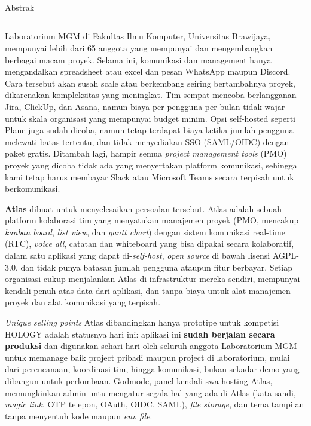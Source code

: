 \clearpage
\section[Abstrak]{}
\\[0.3em]
{\bricolagesb\fontsize{19pt}{22pt}\selectfont\color{cink} Abstrak}
\vspace{0.15em}\\
\noindent\textcolor{cblue!35!white}{\rule{\linewidth}{1.1pt}}
\vspace{0.55em}

Laboratorium MGM di Fakultas Ilmu Komputer, Universitas Brawijaya, mempunyai lebih dari 65 anggota yang mempunyai dan mengembangkan berbagai macam proyek. Selama ini, komunikasi dan management hanya mengandalkan spreadsheet atau excel dan pesan WhatsApp maupun Discord. Cara tersebut akan susah scale atau berkembang seiring bertambahnya proyek, dikarenakan kompleksitas yang meningkat. Tim sempat mencoba berlangganan Jira, ClickUp, dan Asana, namun biaya per-pengguna per-bulan tidak wajar untuk skala organisasi yang mempunyai budget minim. Opsi self-hosted seperti Plane juga sudah dicoba, namun tetap terdapat biaya ketika jumlah pengguna melewati batas tertentu, dan tidak menyediakan SSO (SAML/OIDC) dengan paket gratis. Ditambah lagi, hampir semua \textit{project management tools} (PMO) proyek yang dicoba tidak ada yang menyertakan platform komunikasi, sehingga kami tetap harus membayar Slack atau Microsoft Teams secara terpisah untuk berkomunikasi.

\textbf{Atlas} dibuat untuk menyelesaikan persoalan tersebut. Atlas adalah sebuah platform kolaborasi tim yang menyatukan manajemen proyek (PMO, mencakup \textit{kanban board}, \textit{list view}, dan \textit{gantt chart}) dengan sistem komunikasi real-time (RTC), \textit{voice all}, catatan dan whiteboard yang bisa dipakai secara kolaboratif, dalam satu aplikasi yang dapat di-\textit{self-host}, \textit{open source} di bawah lisensi AGPL-3.0, dan tidak punya batasan jumlah pengguna ataupun fitur berbayar. Setiap organisasi cukup menjalankan Atlas di infrastruktur mereka sendiri, mempunyai kendali penuh atas data dari aplikasi, dan tanpa biaya untuk alat manajemen proyek dan alat komunikasi yang terpisah.

\textit{Unique selling points} Atlas dibandingkan hanya prototipe untuk kompetisi HOLOGY adalah statusnya hari ini: aplikasi ini \textbf{sudah berjalan secara produksi} dan digunakan sehari-hari oleh seluruh anggota Laboratorium MGM untuk memanage baik project pribadi maupun project di laboratorium, mulai dari perencanaan, koordinasi tim, hingga komunikasi, bukan sekadar demo yang dibangun untuk perlombaan. Godmode, panel kendali swa-hosting Atlas, memungkinkan admin untu mengatur segala hal yang ada di Atlas (kata sandi, \textit{magic link}, OTP telepon, OAuth, OIDC, SAML), \textit{file storage}, dan tema tampilan tanpa menyentuh kode maupun \textit{env file}.

